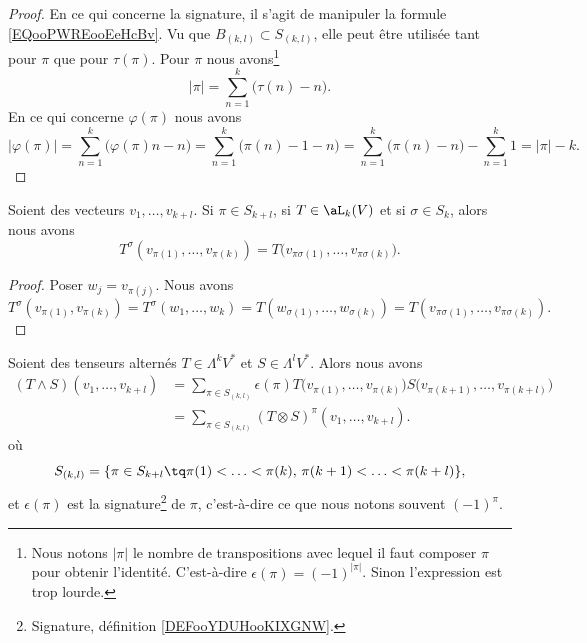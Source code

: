 \begin{proof}
	En ce qui concerne la signature, il s'agit de manipuler la formule \eqref{EQooPWREooEeHcBv}. Vu que \( B_{(k,l)}\subset S_{(k,l)}\), elle peut être utilisée tant pour \( \pi\) que pour \( \tau(\pi)\). Pour \( \pi\) nous avons\footnote{Nous notons \( | \pi |\) le nombre de transpositions avec lequel il faut composer \( \pi\) pour obtenir l'identité. C'est-à-dire \( \epsilon(\pi)=(-1)^{| \pi |}\). Sinon l'expression est trop lourde.}
	\begin{equation}
		| \pi |=\sum_{n=1}^k\big( \tau(n)-n \big).
	\end{equation}
	En ce qui concerne \( \varphi(\pi)\) nous avons
	\begin{equation}
		| \varphi(\pi) |=\sum_{n=1}^k\big( \varphi(\pi)n-n \big)=\sum_{n=1}^k\big( \pi(n)-1-n \big)=\sum_{n=1}^k\big( \pi(n)-n \big)-\sum_{n=1}^k1=| \pi |-k.
	\end{equation}
\end{proof}

\begin{lemma}		\label{LEMooRKWHooBNxZBL}
	Soient des vecteurs \( v_1,\ldots,v_{k+l}\). Si \(\pi \in S_{k+l} \), si \( T\in \aL_k(V)\) et si \( \sigma\in S_k\), alors nous avons
	\begin{equation}		\label{EQooQJXHooTfvclD}
		T^{\sigma}(v_{\pi(1)},\ldots,v_{\pi(k)})=T\big( v_{\pi\sigma(1)},\ldots,v_{\pi\sigma(k)} \big).
	\end{equation}
\end{lemma}

\begin{proof}
	Poser \( w_j=v_{\pi(j)}\). Nous avons
	\begin{equation}
		T^{\sigma}(v_{\pi(1)}, v_{\pi(k)})=T^{\sigma}(w_1,\ldots,w_k)=T(w_{\sigma(1)},\ldots,w_{\sigma(k)})=T(v_{\pi\sigma(1)},\ldots,v_{\pi\sigma(k)}).
	\end{equation}
\end{proof}

\begin{lemma}		\label{LEMooTGNUooZnxkrc}
	Soient des tenseurs alternés \( T\in\Lambda^kV^*\) et \( S\in \Lambda^lV^*\). Alors nous avons
	\begin{subequations}
		\begin{align}
			(T\wedge S)(v_1,\ldots, v_{k+l}) & =\sum_{\pi\in S_{(k,l)}}\epsilon(\pi)T\big( v_{\pi(1)},\ldots,v_{\pi(k)} \big)S\big( v_{\pi(k+1)},\ldots, v_{\pi(k+l)} \big) \\
			                                 & =\sum_{\pi\in S_{(k,l)}}(T\otimes S)^{\pi}(v_1,\ldots,v_{k+l}).		\label{SUBEQooUDLIooWwGFoe}
		\end{align}
	\end{subequations}
	où
	\begin{equation}
		S_{(k,l)}=\{ \pi\in S_{k+l}\tq \pi(1)<\ldots <\pi(k),\,\pi(k+1)<\ldots <\pi(k+l) \},
	\end{equation}
	et \( \epsilon(\pi)\) est la signature\footnote{Signature, définition \ref{DEFooYDUHooKIXGNW}.} de \( \pi\), c'est-à-dire ce que nous notons souvent \( (-1)^{\pi}\).
\end{lemma}

